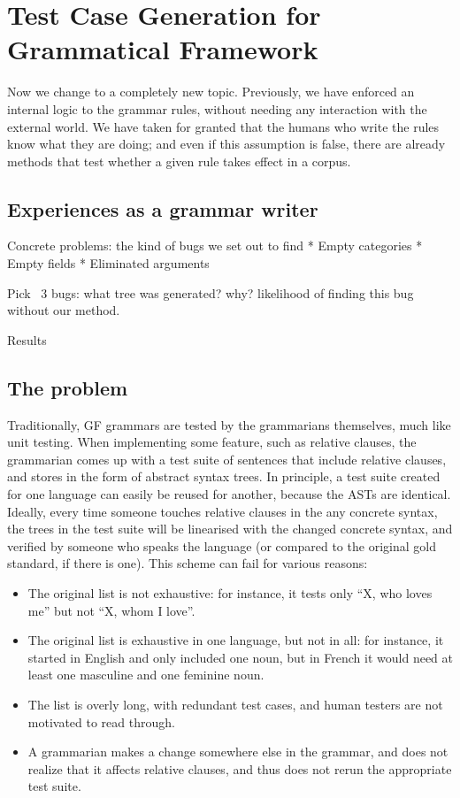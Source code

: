 \def\t#1{\texttt{#1}}


\chapter{Test Case Generation for Grammatical Framework}
\label{chapterGFtest}

Now we change to a completely new topic. 
Previously, we have enforced an internal logic to the grammar rules,
without needing any interaction with the external world. We have taken
for granted that the humans who write the rules know what they are
doing; and even if this assumption is false, there are already methods
that test whether a given rule takes effect in a corpus.


\section{Experiences as a grammar writer}

Concrete problems: the kind of bugs we set out to find
* Empty categories
* Empty fields
* Eliminated arguments

Pick ~3 bugs: 
what tree was generated? why? likelihood of finding this bug without our method.

Results



\section{The problem}

Traditionally, GF grammars are tested by the grammarians themselves,
much like unit testing. When implementing some feature, such as 
relative clauses, the grammarian comes up with a test suite of 
sentences that include relative clauses, and stores in the form of 
abstract syntax trees. In principle, a test suite created for one 
language can easily be reused for another, because the ASTs are 
identical. Ideally, every time someone touches relative clauses 
in the any concrete syntax, the trees in the test suite will be 
linearised with the changed concrete syntax, and verified by someone
who speaks the language (or compared to the original gold standard, 
if there is one). This scheme can fail for various reasons: 

\begin{itemize}
\item The original list is not exhaustive: for instance, it tests only
``X, who loves me'' but not ``X, whom I love''. 
\item The original list is exhaustive in one language, but not in all:
for instance, it started in English and only included one noun, but in
French it would need at least one masculine and one feminine noun. 
\item The list is overly long, with redundant test cases, and human
testers are not motivated to read through. 
\item A grammarian makes a change somewhere else in the grammar, and
does not realize that it affects relative clauses, and thus does not
rerun the appropriate test suite. 
\end{itemize}

